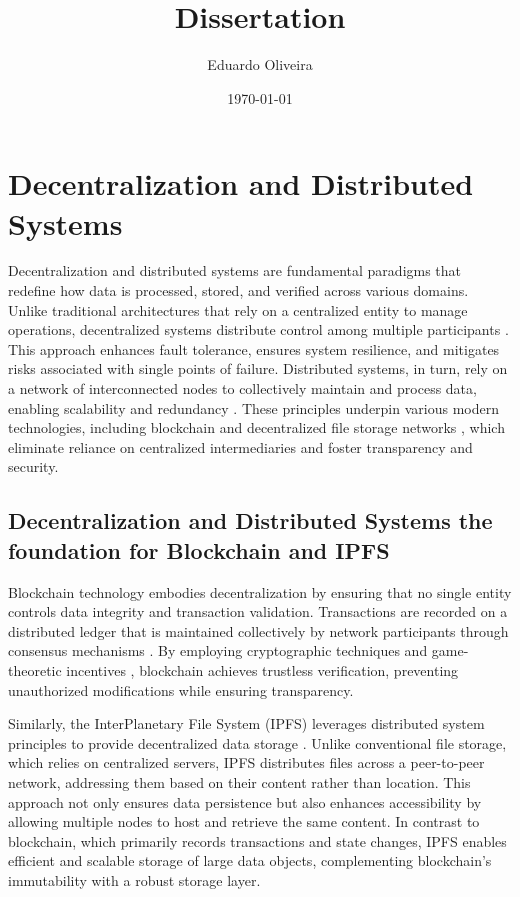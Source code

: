 \documentclass{article}
\title{Dissertation}
\author{Eduardo Oliveira}
\date{\today}
\begin{document}
\maketitle

\section{Decentralization and Distributed Systems}

Decentralization and distributed systems are fundamental paradigms that redefine how data is processed, stored, and verified across various domains. Unlike traditional architectures that rely on a centralized entity to manage operations, decentralized systems distribute control among multiple participants \cite{coulouris2011distributed}. This approach enhances fault tolerance, ensures system resilience, and mitigates risks associated with single points of failure. Distributed systems, in turn, rely on a network of interconnected nodes to collectively maintain and process data, enabling scalability and redundancy   \cite{lamport_1978, coulouris2011distributed}. These principles underpin various modern technologies, including blockchain \cite{nakamoto2008bitcoin} and decentralized file storage networks \cite{benet2014ipfs}, which eliminate reliance on centralized intermediaries and foster transparency and security.


\subsection{Decentralization and Distributed Systems the foundation for Blockchain and IPFS}

Blockchain technology embodies decentralization by ensuring that no single entity controls data integrity and transaction validation. Transactions are recorded on a distributed ledger that is maintained collectively by network participants through consensus mechanisms \cite{nakamoto2008bitcoin}. By employing cryptographic techniques \cite{katz2020introduction} and game-theoretic incentives \cite{roughgarden2016twentyone}, blockchain achieves trustless verification, preventing unauthorized modifications while ensuring transparency.

Similarly, the InterPlanetary File System (IPFS) leverages distributed system principles to provide decentralized data storage \cite{benet2014ipfs}. Unlike conventional file storage, which relies on centralized servers, IPFS distributes files across a peer-to-peer network, addressing them based on their content rather than location. This approach not only ensures data persistence but also enhances accessibility by allowing multiple nodes to host and retrieve the same content. In contrast to blockchain, which primarily records transactions and state changes, IPFS enables efficient and scalable storage of large data objects, complementing blockchain’s immutability with a robust storage layer.
\end{document}
